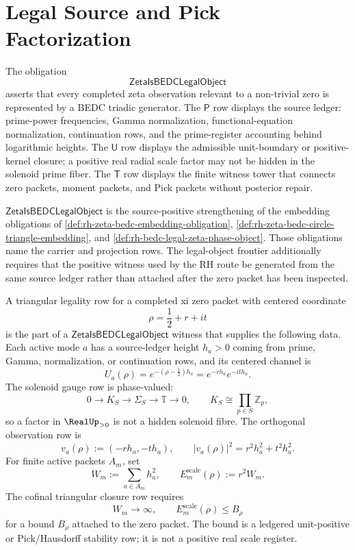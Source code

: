 \section{Legal Source and Pick Factorization}
\label{sec:rh-source-positive-legal-pick}

\begin{definition}[ZetaIsBEDCLegalObject]
\label{def:rh-zeta-is-bedc-legal-object}
The obligation
$$
\mathsf{ZetaIsBEDCLegalObject}
$$
asserts that every completed zeta observation relevant to a non-trivial
zero is represented by a BEDC triadic generator. The $\mathsf P$ row
displays the source ledger: prime-power frequencies, Gamma normalization,
functional-equation normalization, continuation rows, and the
prime-register accounting behind logarithmic heights. The $\mathsf U$
row displays the admissible unit-boundary or positive-kernel closure; a
positive real radial scale factor may not be hidden in the solenoid
prime fiber. The $\mathsf T$ row displays the finite witness tower that
connects zero packets, moment packets, and Pick packets without
posterior repair.
\end{definition}

\begin{principle}
\label{prin:rh-zeta-legal-object-refines-embedding-ledger}
$\mathsf{ZetaIsBEDCLegalObject}$ is the source-positive strengthening of
the embedding obligations of
\autoref{def:rh-zeta-bedc-embedding-obligation},
\autoref{def:rh-zeta-bedc-circle-triangle-embedding}, and
\autoref{def:rh-bedc-legal-zeta-phase-object}. Those obligations name
the carrier and projection rows. The legal-object frontier additionally
requires that the positive witness used by the RH route be generated
from the same source ledger rather than attached after the zero packet
has been inspected.
\end{principle}

\begin{definition}
\label{def:rh-triangular-legality-rows-completed-xi}
A triangular legality row for a completed xi zero packet with centered
coordinate
$$
\rho=\frac12+r+it
$$
is the part of a $\mathsf{ZetaIsBEDCLegalObject}$ witness that supplies
the following data. Each active mode $a$ has a source-ledger height
$h_a>0$ coming from prime, Gamma, normalization, or continuation rows,
and its centered channel is
$$
U_a(\rho)
=
e^{-(\rho-\frac12)h_a}
=
e^{-rh_a}e^{-ith_a}.
$$
The solenoid gauge row is phase-valued:
$$
0\to K_S\to\Sigma_S\to\mathbb T\to0,
\qquad
K_S\cong\prod_{p\in S}\mathbb Z_p,
$$
so a factor in $\RealUp_{>0}$ is not a hidden solenoid fibre. The
orthogonal observation row is
$$
v_a(\rho):=(-rh_a,-th_a),
\qquad
|v_a(\rho)|^2=r^2h_a^2+t^2h_a^2.
$$
For finite active packets $A_m$, set
$$
W_m:=\sum_{a\in A_m}h_a^2,
\qquad
E_m^{\mathrm{scale}}(\rho):=r^2W_m.
$$
The cofinal triangular closure row requires
$$
W_m\to\infty,
\qquad
E_m^{\mathrm{scale}}(\rho)\le B_{\rho}
$$
for a bound $B_{\rho}$ attached to the zero packet. The bound is a
ledgered unit-positive or Pick/Hausdorff stability row; it is not a
positive real scale register.
\end{definition}

